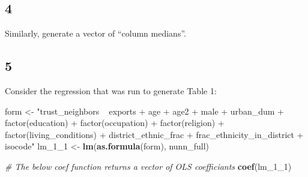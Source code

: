 \documentclass[]{book}
\newenvironment{Shaded}{\begin{snugshade}}{\end{snugshade}}
\newcommand{\KeywordTok}[1]{\textcolor[rgb]{0.13,0.29,0.53}{\textbf{#1}}}
\newcommand{\DecValTok}[1]{\textcolor[rgb]{0.00,0.00,0.81}{#1}}
\newcommand{\StringTok}[1]{\textcolor[rgb]{0.31,0.60,0.02}{#1}}
\newcommand{\CommentTok}[1]{\textcolor[rgb]{0.56,0.35,0.01}{\textit{#1}}}
\newcommand{\NormalTok}[1]{#1}
\theoremstyle{definition}
\theoremstyle{definition}
\theoremstyle{definition}
\theoremstyle{remark}
\begin{document}
\subsection*{4}\label{section-12}

Similarly, generate a vector of ``column medians''.

\subsection*{5}\label{section-13}

Consider the regression that was run to generate Table 1:

\begin{Shaded}
\begin{Highlighting}[]
\NormalTok{form <-}\StringTok{ "trust_neighbors ~ exports + age + age2 +  male + urban_dum + factor(education) + factor(occupation) + factor(religion) + factor(living_conditions) + district_ethnic_frac + frac_ethnicity_in_district + isocode"}
\NormalTok{lm_1_}\DecValTok{1}\NormalTok{ <-}\StringTok{ }\KeywordTok{lm}\NormalTok{(}\KeywordTok{as.formula}\NormalTok{(form), nunn_full)}

\CommentTok{# The below coef function returns a vector of OLS coefficiants}
\KeywordTok{coef}\NormalTok{(lm_1_}\DecValTok{1}\NormalTok{)}
\end{Highlighting}
\end{Shaded}
\end{document}
